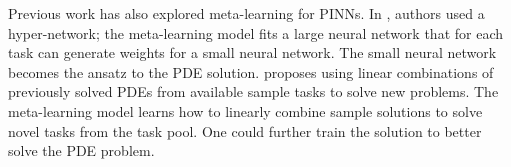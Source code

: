 Previous work has also explored meta-learning for PINNs. In \citet{de2021hyperpinn}, authors used a hyper-network; the meta-learning model fits a large neural network that for each task can generate weights for a small neural network. The small neural network becomes the ansatz to the PDE solution. \citet{penwarden2021physics} proposes using linear combinations of previously solved PDEs from available sample tasks to solve new problems. The meta-learning model learns how to linearly combine sample solutions to solve novel tasks from the task pool. One could further train the solution to better solve the PDE problem.

